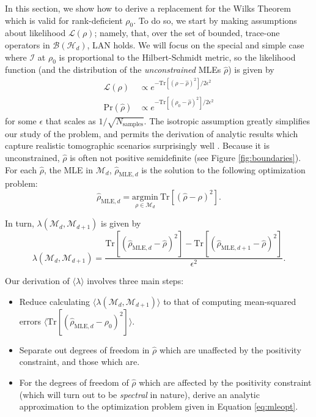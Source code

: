 \documentclass[aps,pra, twocolumn]{revtex4-1}
\newcommand{\M}{\mathcal{M}}
\newcommand{\cL}{\mathcal{L}}
\newcommand{\Fi}{\mathcal{I}}
\newcommand{\rhohat}{\hat{\rho}}
\begin{document}
In this section, we show how to derive a replacement for the Wilks Theorem which is valid for rank-deficient $\rho_{0}$. 
To do so, we start by making assumptions about likelihood $\mathcal{L}(\rho)$; namely, that, over the set of bounded, trace-one operators in $\mathcal{B}(\mathcal{H}_{d})$, LAN holds. We will focus on the special and simple case where $\Fi$ at $\rho_{0}$ is  proportional to the Hilbert-Schmidt metric, so the likelihood function (and the distribution of the \emph{unconstrained} MLEs $\rhohat$) is given by 
\begin{align}
\label{eq:likelihood}
\cL(\rho) & \propto e^{-\mathrm{Tr}[(\rho - \rhohat)^{2}]/2\epsilon^{2}}\\
\mathrm{Pr}(\rhohat) &\propto e^{-\mathrm{Tr}[(\rho_{0} - \rhohat)^{2}]/2\epsilon^{2}}
\end{align}
for some $\epsilon$ that scales as $1 / \sqrt{N_{\mathrm{samples}}}$.  The isotropic assumption greatly simplifies our study of the problem, and permits the derivation of analytic results which capture realistic tomographic scenarios surprisingly well \cite{Smolin2012}. 
Because it is unconstrained, $\rhohat$ is often not positive semidefinite (see Figure \ref{fig:boundaries}). For each $\rhohat$, the MLE in $\M_{d}$, $\hat{\rho}_{\mathrm{MLE},d}$ is the solution to the following optimization problem:
\begin{equation}
\label{eq:mleopt}
\hat{\rho}_{\mathrm{MLE}, d} = \underset{\rho \in \M_{d}}{\mathrm{argmin}}~\mathrm{Tr}[(\rhohat - \rho)^{2}].
\end{equation}

In turn, $\lambda(\M_{d}, \M_{d+1})$ is given by
\begin{equation}
\label{eq:llrs}
\lambda(\M_{d}, \M_{d+1}) = \frac{\mathrm{Tr}[(\hat{\rho}_{\mathrm{MLE}, d}  - \rhohat)^{2}] - \mathrm{Tr}[(\hat{\rho}_{\mathrm{MLE}, d+1} - \rhohat)^{2}]}{\epsilon^{2}}.
\end{equation}

Our derivation of $\langle \lambda \rangle$ involves three main steps:
\begin{itemize}
\item Reduce calculating $\langle \lambda(\M_{d}, \M_{d+1})\rangle$ to that of computing mean-squared errors $\langle \mathrm{Tr}[(\hat{\rho}_{\mathrm{MLE},d} - \rho_{0})^{2}]\rangle$.
\item Separate out degrees of freedom in $\rhohat$ which are unaffected by the positivity constraint, and those which are.
\item For the degrees of freedom of $\rhohat$ which are affected by the positivity constraint (which will turn out to be \emph{spectral} in nature), derive an analytic approximation to the optimization problem given in Equation \eqref{eq:mleopt}.
\end{itemize}
\end{document}
